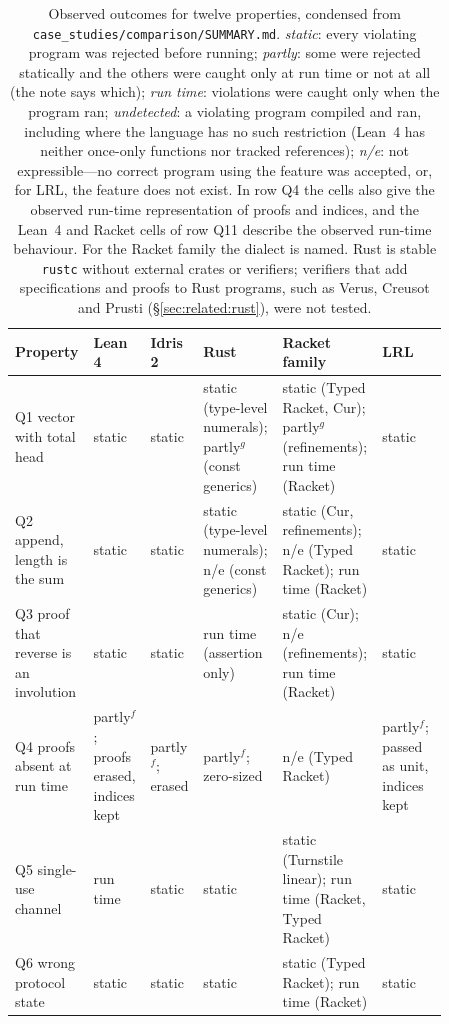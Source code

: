 \begin{table}[t]
\centering\footnotesize
\caption{Observed outcomes for twelve properties, condensed from \texttt{case\_studies/comparison/SUMMARY.md}. \emph{static}: every violating program was rejected before running; \emph{partly}: some were rejected statically and the others were caught only at run time or not at all (the note says which); \emph{run time}: violations were caught only when the program ran; \emph{undetected}: a violating program compiled and ran, including where the language has no such restriction (Lean~4 has neither once-only functions nor tracked references); \emph{n/e}: not expressible---no correct program using the feature was accepted, or, for LRL, the feature does not exist. In row Q4 the cells also give the observed run-time representation of proofs and indices, and the Lean~4 and Racket cells of row Q11 describe the observed run-time behaviour. For the Racket family the dialect is named. Rust is stable \texttt{rustc} without external crates or verifiers; verifiers that add specifications and proofs to Rust programs, such as Verus, Creusot and Prusti (\S\ref{sec:related:rust}), were not tested.}
\label{tab:compare}
\begin{tabular}{p{0.16\linewidth}p{0.11\linewidth}p{0.11\linewidth}p{0.14\linewidth}p{0.18\linewidth}p{0.155\linewidth}}\hline
\textbf{Property} & \textbf{Lean 4} & \textbf{Idris 2} & \textbf{Rust} & \textbf{Racket family} & \textbf{LRL}\\\hline\hline
Q1 vector with total head & static & static & static (type-level numerals); partly$^g$ (const generics) & static (Typed Racket, Cur); partly$^g$ (refinements); run time (Racket) & static\\\hline
Q2 append, length is the sum & static & static & static (type-level numerals); n/e (const generics) & static (Cur, refinements); n/e (Typed Racket); run time (Racket) & static\\\hline
Q3 proof that reverse is an involution & static & static & run time (assertion only) & static (Cur); n/e (refinements); run time (Racket) & static\\\hline
Q4 proofs absent at run time & partly$^f$; proofs erased, indices kept & partly$^f$; erased & partly$^f$; zero-sized & n/e (Typed Racket) & partly$^f$; passed as unit, indices kept\\\hline
Q5 single-use channel & run time & static & static & static (Turnstile linear); run time (Racket, Typed Racket) & static\\\hline
Q6 wrong protocol state & static & static & static & static (Typed Racket); run time (Racket) & static\\\hline

\end{tabular}
\end{table}
